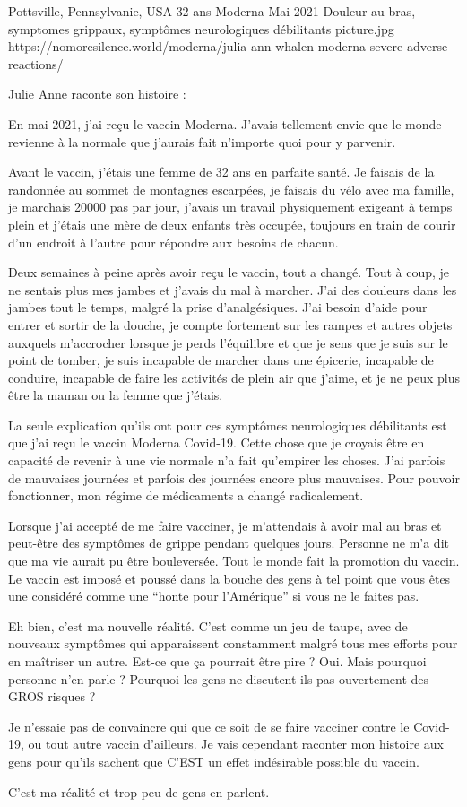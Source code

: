 {Pottsville, Pennsylvanie, USA}
{32 ans}
{Moderna}
{Mai 2021}
{Douleur au bras, symptomes grippaux, symptômes neurologiques débilitants}
{picture.jpg}
{https://nomoresilence.world/moderna/julia-ann-whalen-moderna-severe-adverse-reactions/}
{

Julie Anne raconte son histoire :

En mai 2021, j'ai reçu le vaccin Moderna. J'avais tellement envie que le monde
revienne à la normale que j'aurais fait n'importe quoi pour y parvenir.

Avant le vaccin, j'étais une femme de 32 ans en parfaite santé. Je faisais de la
randonnée au sommet de montagnes escarpées, je faisais du vélo avec ma famille,
je marchais 20000 pas par jour, j'avais un travail physiquement exigeant à temps
plein et j'étais une mère de deux enfants très occupée, toujours en train de
courir d'un endroit à l'autre pour répondre aux besoins de chacun.

Deux semaines à peine après avoir reçu le vaccin, tout a changé. Tout à coup, je
ne sentais plus mes jambes et j'avais du mal à marcher. J'ai des douleurs dans
les jambes tout le temps, malgré la prise d'analgésiques. J'ai besoin d'aide
pour entrer et sortir de la douche, je compte fortement sur les rampes et autres
objets auxquels m'accrocher lorsque je perds l'équilibre et que je sens que je
suis sur le point de tomber, je suis incapable de marcher dans une épicerie,
incapable de conduire, incapable de faire les activités de plein air que j'aime,
et je ne peux plus être la maman ou la femme que j'étais.

La seule explication qu'ils ont pour ces symptômes neurologiques débilitants est
que j'ai reçu le vaccin Moderna Covid-19. Cette chose que je croyais être en
capacité de revenir à une vie normale n'a fait qu'empirer les choses. J'ai
parfois de mauvaises journées et parfois des journées encore plus
mauvaises. Pour pouvoir fonctionner, mon régime de médicaments a changé
radicalement.

Lorsque j'ai accepté de me faire vacciner, je m'attendais à avoir mal au bras et
peut-être des symptômes de grippe pendant quelques jours. Personne ne m'a dit
que ma vie aurait pu être bouleversée. Tout le monde fait la promotion du
vaccin. Le vaccin est imposé et poussé dans la bouche des gens à tel point que
vous êtes une considéré comme une “honte pour l'Amérique” si vous ne le faites
pas.

Eh bien, c'est ma nouvelle réalité. C'est comme un jeu de taupe, avec de
nouveaux symptômes qui apparaissent constamment malgré tous mes efforts pour en
maîtriser un autre. Est-ce que ça pourrait être pire ? Oui. Mais pourquoi
personne n'en parle ? Pourquoi les gens ne discutent-ils pas ouvertement des
GROS risques ?

Je n'essaie pas de convaincre qui que ce soit de se faire vacciner contre le
Covid-19, ou tout autre vaccin d'ailleurs. Je vais cependant raconter mon
histoire aux gens pour qu'ils sachent que C'EST un effet indésirable possible du
vaccin.

C'est ma réalité et trop peu de gens en parlent.

}
